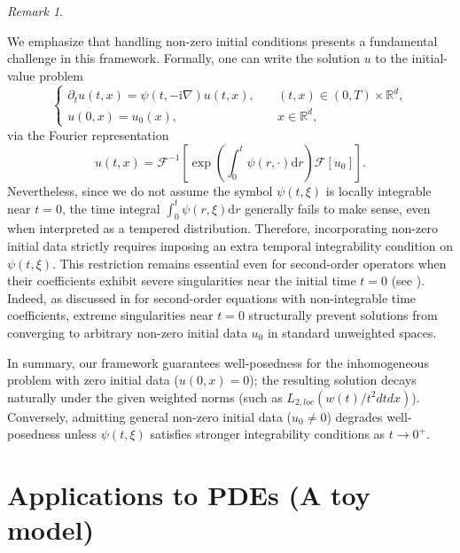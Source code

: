 \documentclass[11pt,reqno]{amsart}
\theoremstyle{definition}
\theoremstyle{remark}
\newtheorem{rem}[thm]{Remark}
\newcommand\cF{\mathcal{F}}
\numberwithin{equation}{section}
\newcommand{\mysection}[1]{\section{#1}}
\begin{document}
\begin{rem}
													\label{zero initial reason}


We emphasize that handling non-zero initial conditions presents a fundamental challenge in this framework. 
Formally, one can write the solution $u$ to the initial-value problem
\begin{equation*}
\begin{cases}
\partial_tu(t,x)=\psi(t,-\mathrm{i}\nabla)u(t,x),\quad &(t,x)\in(0,T)\times\mathbb{R}^d,\\
u(0,x)=u_0(x),\quad & x\in\mathbb{R}^d,
\end{cases}
\end{equation*}
via the Fourier representation
$$  
u(t,x) = \cF^{-1}\left[ \exp\left(\int_0^t\psi(r,\cdot)\mathrm{d}r \right) \cF[u_0] \right].  
$$
Nevertheless, since we do not assume the symbol $\psi(t,\xi)$ is locally integrable near $t=0$, the time integral $\int_0^t\psi(r,\xi)\mathrm{d}r$ generally fails to make sense, even when interpreted as a tempered distribution. 
Therefore, incorporating non-zero initial data strictly requires imposing an extra temporal integrability condition on $\psi(t,\xi)$. 
This restriction remains essential even for second-order operators when their coefficients exhibit severe singularities near the initial time $t=0$ (see \cite[Remark 2.34]{KK 2026}). 
Indeed, as discussed in \cite[Remark 2.34]{KK 2026} for second-order equations with non-integrable time coefficients, extreme singularities near $t=0$ structurally prevent solutions from converging to arbitrary non-zero initial data $u_0$ in standard unweighted spaces. 



In summary, our framework guarantees well-posedness for the inhomogeneous problem with zero initial data ($u(0,x)=0$); the resulting solution decays naturally under the given weighted norms (such as $L_{2,loc}(w(t)/t^2 dtdx)$). 
Conversely, admitting general non-zero initial data ($u_0 \neq 0$) degrades well-posedness unless $\psi(t,\xi)$ satisfies stronger integrability conditions as $t \to 0^+$.


\end{rem}


\mysection{Applications to PDEs (A toy model)}
\end{document}
